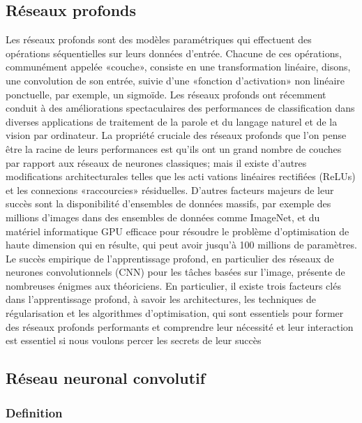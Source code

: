 \documentclass[
  12pt,
  dvipsnames]{article}
\begin{document}
\hypertarget{ruxe9seaux-profonds}{%
\subsection{Réseaux profonds}\label{ruxe9seaux-profonds}}

Les réseaux profonds sont des modèles paramétriques qui effectuent des opérations séquentielles sur leurs données d'entrée. Chacune de ces opérations, communément appelée «couche», consiste en une transformation linéaire, disons, une convolution de son entrée, suivie d'une «fonction d'activation» non linéaire ponctuelle, par exemple, un sigmoïde. Les réseaux profonds ont récemment conduit à des améliorations spectaculaires des performances de classification dans diverses applications de traitement de la parole et du langage naturel et de la vision par ordinateur. La propriété cruciale des réseaux profonds que l'on pense être la racine de leurs performances est qu'ils ont un grand nombre de couches par rapport aux réseaux de neurones classiques; mais il existe d'autres modifications architecturales telles que les acti vations linéaires rectifiées (ReLUs) et les connexions «raccourcies» résiduelles. D'autres facteurs majeurs de leur succès sont la disponibilité d'ensembles de données massifs, par exemple des millions d'images dans des ensembles de données comme ImageNet, et du matériel informatique GPU efficace pour résoudre le problème d'optimisation de haute dimension qui en résulte, qui peut avoir jusqu'à 100 millions de paramètres. Le succès empirique de l'apprentissage profond, en particulier des réseaux de neurones convolutionnels (CNN) pour les tâches basées sur l'image, présente de nombreuses énigmes aux théoriciens. En particulier, il existe trois facteurs clés dans l'apprentissage profond, à savoir les architectures, les techniques de régularisation et les algorithmes d'optimisation, qui sont essentiels pour former des réseaux profonds performants et comprendre leur nécessité et leur interaction est essentiel si nous voulons percer les secrets de leur succès

\hypertarget{ruxe9seau-neuronal-convolutif}{%
\subsection{Réseau neuronal convolutif}\label{ruxe9seau-neuronal-convolutif}}

\hypertarget{definition}{%
\subsubsection{Definition}\label{definition}}
\end{document}
